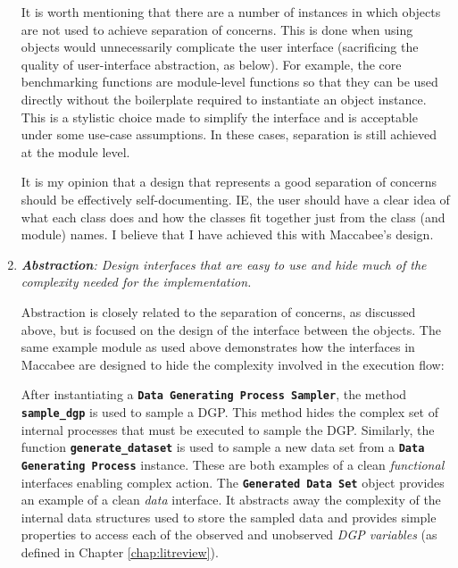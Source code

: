 \documentclass[../main.tex]{subfiles}
\begin{document}
\begin{enumerate}
    It is worth mentioning that there are a number of instances in which objects are not used to achieve separation of concerns. This is done when using objects would unnecessarily complicate the user interface (sacrificing the quality of user-interface abstraction, as below). For example, the core benchmarking functions are module-level functions so that they can be used directly without the boilerplate required to instantiate an object instance. This is a stylistic choice made to simplify the interface and is acceptable under some use-case assumptions. In these cases, separation is still achieved at the module level.
    
    It is my opinion that a design that represents a good separation of concerns should be effectively self-documenting. IE, the user should have a clear idea of what each class does and how the classes fit together just from the class (and module) names. I believe that I have achieved this with Maccabee's design.
    
    \item \textit{\textbf{Abstraction}: Design interfaces that are easy to use and hide much of the complexity needed for the implementation.}
    
    Abstraction is closely related to the separation of concerns, as discussed above, but is focused on the design of the interface between the objects. The same example module as used above demonstrates how the interfaces in Maccabee are designed to hide the complexity involved in the execution flow:
    
    \begin{displayquote}
    After instantiating a \textbf{\texttt{Data Generating Process Sampler}}, the method \textbf{\lstinline{sample_dgp}} is used to sample a DGP. This method hides the complex set of internal processes that must be executed to sample the DGP. Similarly, the function \textbf{\lstinline{generate_dataset}} is used to sample a new data set from a \textbf{\texttt{Data Generating Process}} instance. These are both examples of a clean \textit{functional} interfaces enabling complex action. The \textbf{\texttt{Generated Data Set}} object provides an example of a clean \textit{data} interface. It abstracts away the complexity of the internal data structures used to store the sampled data and provides simple properties to access each of the observed and unobserved \textit{DGP variables} (as defined in Chapter \ref{chap:litreview}).
    \end{displayquote}
    

\end{enumerate}
\end{document}
